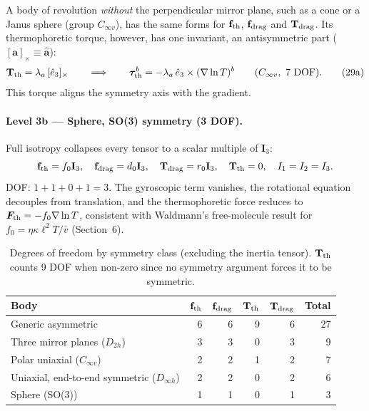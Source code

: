 \documentclass[11pt]{article}
\newcommand{\chg}[1]{\marginpar{\raggedright\footnotesize\textcolor{red!70!black}{\textsf{#1}}}}
\newcommand{\vect}[1]{\bm{#1}}
\begin{document}
A body of revolution \emph{without} the perpendicular mirror plane, such as a cone or a Janus sphere (group $C_{\infty v}$), has the same forms for $\mathbf f_{\rm th}$, $\mathbf f_{\rm drag}$ and $\mathbf T_{\rm drag}$. Its thermophoretic torque, however, has one invariant, an antisymmetric part ($[\vect a]_\times\equiv\widehat{\vect a}$):
\begin{equation}
  \mathbf T_{\rm th} = \lambda_a\,[\hat e_3]_\times \qquad \Longrightarrow \qquad \vect\tau^b_{\rm th} = -\lambda_a\,\hat e_3\times(\nabla\ln T)^b \qquad (C_{\infty v},\ 7\ \text{DOF}). \tag{29a}
\end{equation}
This torque aligns the symmetry axis with the gradient.

\paragraph{Level 3b --- Sphere, SO(3) symmetry (3 DOF).} Full isotropy collapses every tensor to a scalar multiple of $\mathbf I_3$:
\begin{equation}
  \mathbf f_{\rm th}=f_0\mathbf I_3,\quad \mathbf f_{\rm drag}=d_0\mathbf I_3,\quad \mathbf T_{\rm drag}=r_0\mathbf I_3,\quad \mathbf T_{\rm th}=0,\quad I_1=I_2=I_3.
\end{equation}
DOF: $1+1+0+1=3$. The gyroscopic term vanishes, the rotational equation decouples from translation, and the thermophoretic force reduces to $\vect F_{\rm th}=-f_0\nabla\ln T$, consistent with Waldmann's free-molecule result for $f_0=\eta\kappa\ell^2T/\bar v$ (Section~6).\chg{C8}

\begin{table}[h]
\centering
\caption{Degrees of freedom by symmetry class (excluding the inertia tensor). $\mathbf T_{\rm th}$ counts 9 DOF when non-zero since no symmetry argument forces it to be symmetric.}
\begin{tabular}{lrrrrr}
\toprule
Body & $\mathbf f_{\rm th}$ & $\mathbf f_{\rm drag}$ & $\mathbf T_{\rm th}$ & $\mathbf T_{\rm drag}$ & Total\\
\midrule
Generic asymmetric & 6 & 6 & 9 & 6 & 27\\
Three mirror planes ($D_{2h}$) & 3 & 3 & 0 & 3 & 9\\
Polar uniaxial ($C_{\infty v}$) & 2 & 2 & 1 & 2 & 7\\
Uniaxial, end-to-end symmetric ($D_{\infty h}$) & 2 & 2 & 0 & 2 & 6\\
Sphere (SO(3)) & 1 & 1 & 0 & 1 & 3\\
\bottomrule
\end{tabular}
\end{table}
\end{document}
